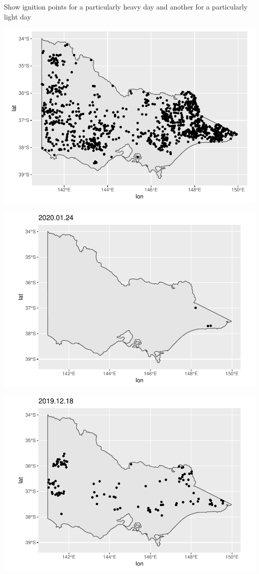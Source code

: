 Show ignition points for a particularly heavy day and another for a
particularly light day

\begin{Schunk}

\includegraphics[width=0.8\linewidth]{clustering_paper_files/figure-latex/unnamed-chunk-2-1} \end{Schunk}

\begin{Schunk}

\includegraphics[width=0.8\linewidth]{clustering_paper_files/figure-latex/unnamed-chunk-4-1} \end{Schunk}

\begin{Schunk}

\includegraphics[width=0.8\linewidth]{clustering_paper_files/figure-latex/unnamed-chunk-5-1} \end{Schunk}

